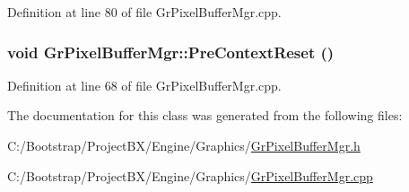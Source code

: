 Definition at line 80 of file GrPixelBufferMgr.cpp.\hypertarget{class_gr_pixel_buffer_mgr_0385b0a4ac49d123f10aeb25285f0a63}{
\subsubsection[{PreContextReset}]{\setlength{\rightskip}{0pt plus 5cm}void GrPixelBufferMgr::PreContextReset ()}}
\label{class_gr_pixel_buffer_mgr_0385b0a4ac49d123f10aeb25285f0a63}




Definition at line 68 of file GrPixelBufferMgr.cpp.

The documentation for this class was generated from the following files:\begin{CompactItemize}
\item 
C:/Bootstrap/ProjectBX/Engine/Graphics/\hyperlink{_gr_pixel_buffer_mgr_8h}{GrPixelBufferMgr.h}\item 
C:/Bootstrap/ProjectBX/Engine/Graphics/\hyperlink{_gr_pixel_buffer_mgr_8cpp}{GrPixelBufferMgr.cpp}\end{CompactItemize}
